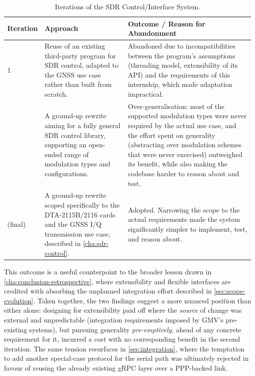 \begin{table}[h]
\centering
\caption{Iterations of the SDR Control/Interface System.}
\label{tab:sdr-iterations}
\begin{tabular}{p{2.2cm} p{4.7cm} p{5.8cm}}
\toprule
\textbf{Iteration} & \textbf{Approach} & \textbf{Outcome / Reason for Abandonment} \\
\midrule
1 & 
    Reuse of an existing third-party program for \gls{SDR} control,
    adapted to the \gls{GNSS} use case rather than built from
    scratch. &
    Abandoned due to incompatibilities between the program's
    assumptions 
    (threading model, extensibility of its API) and the requirements of this
    internship, which made adaptation impractical. \\
\addlinespace
2 & A ground-up rewrite aiming for a fully general \gls{SDR} control
    library, supporting an open-ended range of modulation types
    and configurations. &
    Over-generalisation: most of the supported modulation types
    were never required by the actual use case, and the effort
    spent on generality (abstracting over modulation schemes that
    were never exercised) outweighed its benefit, while also
    making the codebase harder to reason about and test. \\
\addlinespace
3 (final) & A ground-up rewrite scoped specifically to the
    DTA-2115B/2116 cards and the \gls{GNSS} \gls{I/Q} transmission
    use case, described in \autoref{cha:sdr-control}. &
    Adopted. Narrowing the scope to the actual requirements
    made the system significantly simpler to implement, test, and
    reason about. \\
\bottomrule
\end{tabular}
\end{table}
 
This outcome is a useful counterpoint to the broader lesson drawn
in \autoref{cha:conclusion-retrospective}, where extensibility and
flexible interfaces are credited with absorbing the unplanned
integration effort described in \autoref{sec:scope-evolution}.
Taken together, the two findings suggest a more nuanced position
than either alone: designing for extensibility paid off where the
\emph{source} of change was external and unpredictable (integration
requirements imposed by GMV's pre-existing systems), but pursuing
generality \emph{pre-emptively}, ahead of any concrete requirement
for it, incurred a cost with no corresponding benefit in the second
iteration. The same tension resurfaces in
\autoref{sec:integration}, where the temptation to add another
special-case protocol for the serial path was ultimately rejected in favour of
reusing the already existing gRPC layer over a \gls{PPP}-backed link.
